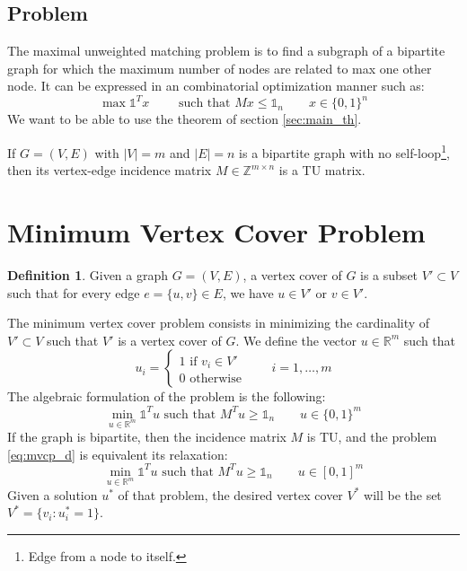 \documentclass[12pt, openany]{report}
\newcommand{\R}{\mathbb{R}}
\theoremstyle{definition}
\newtheorem{definition}[thm]{Definition}
\begin{document}
\subsection{Problem}
The maximal unweighted matching problem is to find a subgraph of a bipartite graph for which the maximum number of nodes are related to max one other node. It can be expressed in an combinatorial optimization manner such as:
\begin{equation}
    \max \mathbb{1}^Tx \qquad \text{ such that } Mx\le \mathbb{1}_n \qquad x\in \{0,1\}^n
\end{equation}
We want to be able to use the theorem of section \ref{sec:main_th}. 
\begin{tcolorbox}[breakable,
    colback=white,
    colframe=white!75!black,
    title={Theorem}]
If \(G=(V,E)\) with \(|V| = m\) and \(|E|=n\) is a bipartite graph with no self-loop\footnote{Edge from a node to itself.}, then its vertex-edge incidence matrix \(M\in \mathbb{Z}^{m\times n}\) is a TU matrix.
\end{tcolorbox}
\section{Minimum Vertex Cover Problem}
\begin{definition}
    Given a graph \(G=(V,E)\), a vertex cover of \(G\) is a subset \(V'\subset V\) such that for every edge \(e=\{u,v\}\in E\), we have \(u\in V'\) or \(v\in V'\).
\end{definition}
The minimum vertex cover problem consists in minimizing the cardinality of \(V'\subset V\) such that \(V'\) is a vertex cover of \(G\). We define the vector \(u\in \R^m\) such that
\begin{equation}
    u_i = \begin{cases}
        1 \text{ if } v_i\in V'\\
        0\text{ otherwise}
    \end{cases}\qquad i=1,\dots,m
\end{equation}
The algebraic formulation of the problem is the following:
\begin{equation}\label{eq:mvcp_d}
    \min_{u\in \R^m}\mathbb{1}^Tu \text{ such that }M^Tu\ge \mathbb{1}_n\qquad u\in \{0,1\}^m
\end{equation}
If the graph is bipartite, then the incidence matrix \(M\) is TU, and the problem \eqref{eq:mvcp_d} is equivalent its relaxation:
\begin{equation}
    \min_{u\in \R^m}\mathbb{1}^Tu \text{ such that }M^Tu\ge \mathbb{1}_n\qquad u\in [0,1]^m
\end{equation}
Given a solution \(u^*\) of that problem, the desired vertex cover \(V^*\) will be the set \(V^* = \{v_i:u_i^*=1\}\). 
\end{document}
